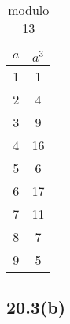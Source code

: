 \begin{table}[H]
\begin{subtable}{.24\linewidth}
	\centering
	\begin{tabular}{c|c}
		$a$ & $a^3$ \\ \hline
		1   & 1  \\
		2   & 4  \\
		3   & 9  \\
		4   & 16 \\
		5   & 6  \\
		6   & 17 \\
		7   & 11 \\
		8   & 7  \\
		9   & 5
	\end{tabular}
	\caption*{modulo 13}
\end{subtable}
\end{table}


\subsection{20.3(b)}